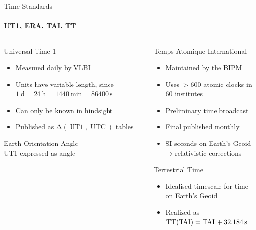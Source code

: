 \documentclass[aspectratio=1610, 9pt]{beamer}
\begin{document}
\begin{frame}{Time Standards}
  \framesubtitle{UT1, ERA, TAI, TT}
  \begin{columns}[t, onlytextwidth]
    \begin{column}{0.495\textwidth}
      \begin{center}

        \begin{description}
          \item[UT1] Universal Time 1
            \begin{itemize}
              \item Measured daily by VLBI
              \item Units have variable length, since $\SI{1}{\day} = \SI{24}{\hour} = \SI{1440}{\minute} = \SI{86400}{\second}$
              \item Can only be known in hindsight
              \item Published as $\increment(\operatorname{UT1}, \operatorname{UTC})$ tables
            \end{itemize}
          \item[ERA ($\theta$)] Earth Orientation Angle \\
            UT1 expressed as angle
        \end{description}
      \end{center}
    \end{column}
    \begin{column}{0.495\textwidth}
      \begin{center}
        \begin{description}[TAI]
          \item[TAI] Temps Atomique International
            \begin{itemize}
              \item Maintained by the BIPM
              \item Uses $>600$ atomic clocks in 60 institutes
              \item Preliminary \TAI{} time broadcast
              \item Final \TAI{} published monthly
              \item SI seconds on Earth's Geoid\\ → relativistic corrections
            \end{itemize}
          \item[TT] Terrestrial Time
            \begin{itemize}
              \item Idealised timescale for time on Earth's Geoid
              \item Realized as $\operatorname{TT}(\operatorname{TAI}) = \operatorname{TAI}{} + \SI{32.184}{\second}$
            \end{itemize}
        \end{description}
      \end{center}
    \end{column}
  \end{columns}
\end{frame}
\end{document}
